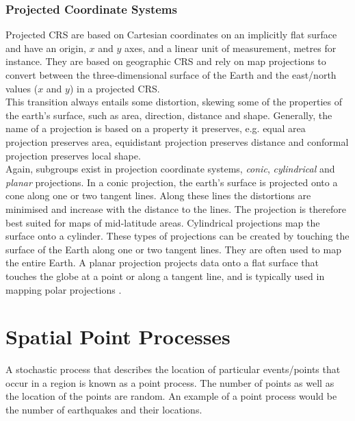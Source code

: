 \subsubsection*{Projected Coordinate Systems}
Projected CRS are based on Cartesian coordinates on an implicitly flat surface and have an origin, $x$ and $y$ axes, and a linear unit of measurement, metres for instance. They are based on geographic CRS and rely on map projections to convert between the three-dimensional surface of the Earth and the east/north values ($x$ and $y$) in a projected CRS.\\
This transition always entails some distortion, skewing some of the properties of the earth's surface, such as area, direction, distance and shape. Generally, the name of a projection is based on a property it preserves, e.g. equal area projection preserves area, equidistant projection preserves distance and conformal projection preserves local shape. \\
Again, subgroups exist in projection coordinate systems, \textit{conic}, \textit{cylindrical} and \textit{planar} projections. In a conic projection, the earth's surface is projected onto a cone along one or two tangent lines. Along these lines the distortions are minimised and increase with the distance to the lines. The projection is therefore best suited for maps of mid-latitude areas. Cylindrical projections map the surface onto a cylinder. These types of projections can be created by touching the surface of the Earth along one or two tangent lines. They are often used to map the entire Earth. A planar projection projects data onto a flat surface that touches the globe at a point or along a tangent line, and is typically used in mapping polar projections \autocite[][]{lovelace2019geocomputation}.
\clearpage
\section{Spatial Point Processes}
A stochastic process that describes the location of particular events/points that occur in a region is known as a point process. The number of points as well as the location of the points are random. An example of a point process would be the number of earthquakes and their locations.
